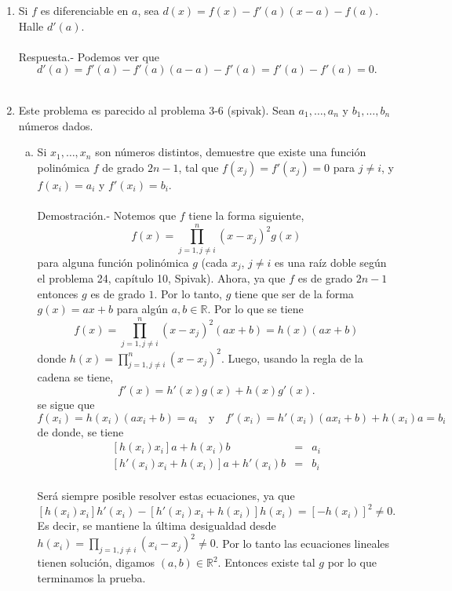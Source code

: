 \begin{enumerate}[\bfseries 1.]
\begin{enumerate}[(a)]
	 \end{enumerate}

     \item Si $f$ es diferenciable en $a$, sea $d(x)=f(x)-f'(a)(x-a)-f(a).$ Halle $d'(a).$\\\\
	 Respuesta.-\; Podemos ver que 
	 $$d'(a)=f'(a)-f'(a)(a-a)-f'(a)=f'(a)-f'(a)=0.$$\\

     \item Este problema es parecido al problema 3-6 (spivak). Sean $a_1,\ldots , a_n$ y $b_1,\ldots, b_n$ números dados.\\
	 \begin{enumerate}[(a)]

	     \item Si $x_1,\ldots , x_n$ son números distintos, demuestre que existe una función polinómica $f$ de grado $2n-1$, tal que $f\left(x_j\right)=f'\left(x_j\right)=0$ para $j\neq i$, y $f(x_i)=a_i$ y $f'(x_i)=b_i$.\\\\
		 Demostración.-\; Notemos que  $f$ tiene la forma siguiente,
		 $$f(x)=\prod_{j=1,j\neq i}^n (x-x_j)^2g(x)$$
		 para alguna función polinómica $g$ (cada $x_j$, $j\neq i$ es una raíz doble según el problema 24, capítulo 10, Spivak). Ahora, ya que $f$ es de grado $2n-1$ entonces $g$ es de grado $1$. Por lo tanto, $g$ tiene que ser de la forma $g(x)=ax+b$ para algún $a,b\in \mathbb{R}$. Por lo que se tiene
		 $$f(x)=\prod_{j=1, j\neq i}^n (x-x_j)^2(ax+b)=h(x)(ax+b)$$
		 donde $\displaystyle h(x)=\prod_{j=1, j\neq i}^n (x-x_j)^2$. Luego, usando la regla de la cadena  se tiene,
		 $$f'(x)=h'(x) g(x)+h(x)g'(x).$$
		 se sigue que
		 $$f(x_i)=h(x_i)(ax_i+b)=a_i \quad \mbox{y} \quad f'(x_i)=h'(x_i)(ax_i+b)+h(x_i)a=b_i$$
		 de donde, se tiene
		 $$\begin{array}{rcl}
		     \left[h(x_i)x_i\right]a+h(x_i)b&=&a_i\\
		     \left[h'(x_i)x_i+h(x_i)\right]a+h'(x_i)b&=&b_i\\
		 \end{array}$$

		 Será siempre posible resolver estas ecuaciones, ya que 
		 $$\left[h(x_i)x_i\right]h'(x_i)-\left[h'(x_i)x_i+h(x_i)\right]h(x_i)=\left[-h(x_i)\right]^2\neq 0.$$
		 Es decir, se mantiene la última desigualdad desde $\displaystyle h(x_i)=\prod_{j=1,j\neq i}(x_i-x_j)^2\neq 0$. Por lo tanto las ecuaciones lineales tienen solución, digamos $(a,b)\in \mathbb{R}^2$. Entonces existe tal $g$ por lo que terminamos la prueba.\\\\


\end{enumerate}
\end{enumerate}
